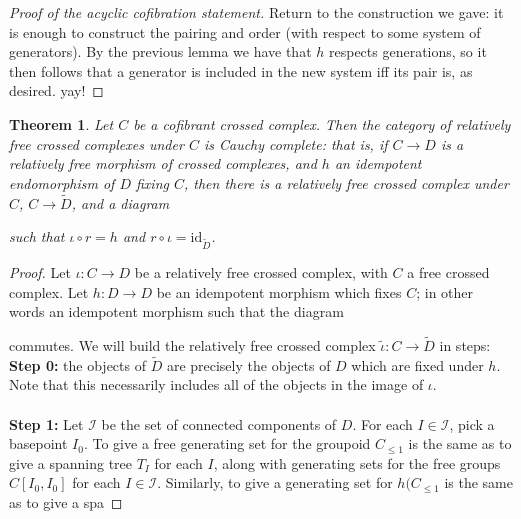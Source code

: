 \documentclass[12pt]{article}
\newtheorem{theorem}{Theorem}[section]
\theoremstyle{definition}
\newcommand{\id}{\text{id}}
\begin{document}
	\begin{proof}[Proof of the acyclic cofibration statement]
		Return to the construction we gave: it is enough to construct the pairing and order (with respect to some system of generators). By the previous lemma we have that $h$ respects generations, so it then follows that a generator is included in the new system iff its pair is, as desired. yay! 
	\end{proof}
	\begin{theorem}
		Let $C$ be a cofibrant crossed complex. Then the category of relatively free crossed complexes under $C$ is Cauchy complete: that is, if $C \to D$ is a relatively free morphism of crossed complexes, and $h$ an idempotent endomorphism of $D$ fixing $C$, then there is a relatively free crossed complex under $C$, $C \to \tilde{D}$, and a diagram 
		\begin{center}
		\end{center}
		such that $\iota \circ r = h$ and $r \circ \iota = \id_{\tilde{D}}$.
	\end{theorem}
	
	
	\begin{proof}
		Let $\iota: C \to D$ be a relatively free crossed complex, with $C$ a free crossed complex. Let $h: D \to D$ be an idempotent morphism which fixes $C$; in other words an idempotent morphism such that the diagram
		\begin{center}
		\end{center}
		commutes. We will build the relatively free crossed complex $\tilde{\iota}: C \to \tilde{D}$ in steps:\\
		\textbf{Step 0:} the objects of $\tilde{D}$ are precisely the objects of $D$ which are fixed under $h$. Note that this necessarily includes all of the objects in the image of $\iota$. \\\\
		\textbf{Step 1:} Let $\mathcal{I}$ be the set of connected components of $D$. For each $I \in \mathcal{I}$, pick a basepoint $I_0$. To give a free generating set for the groupoid $C_{\le 1}$ is the same as to give a spanning tree $T_I$ for each $I$, along with generating sets for the free groups $C[I_0,I_0]$ for each $I \in \mathcal{I}$. Similarly, to give a generating set for $h(C_{\le 1}$ is the same as to give a spa
	\end{proof}
	
\end{document}

